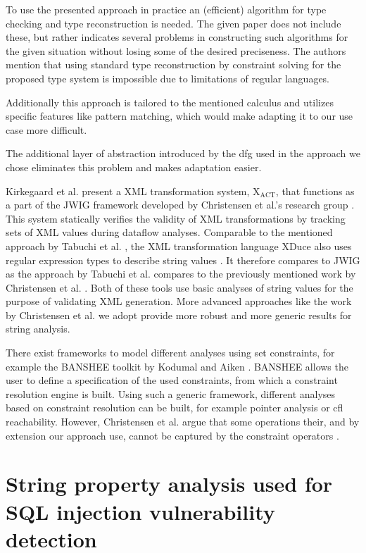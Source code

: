 To use the presented approach in practice an (efficient) algorithm for type checking and type reconstruction is needed. 
The given paper does not include these, but rather indicates several problems in constructing such algorithms for the given situation without losing some of the desired preciseness.
The authors mention that using standard type reconstruction by constraint solving for the proposed type system is impossible due to limitations of regular languages.

Additionally this approach is tailored to the mentioned calculus and utilizes specific features like pattern matching, which would make adapting it to our use case more difficult.

The additional layer of abstraction introduced by the \ac{dfg} used in the approach we chose eliminates this problem and makes adaptation easier.

Kirkegaard et al. present a XML transformation system, $\text{X}_{\text{ACT}}$, that functions as a part of the JWIG framework developed by Christensen et al.'s research group \cite{xact}. This system statically verifies the validity of XML transformations by tracking sets of XML values during dataflow analyses.
Comparable to the mentioned approach by Tabuchi et al. \cite{regex_types}, the XML transformation language XDuce also uses regular expression types to describe string values \cite{xduce}. It therefore compares to JWIG as the approach by Tabuchi et al. compares to the previously mentioned work by Christensen et al. \cite{brics}. 
Both of these tools use basic analyses of string values for the purpose of validating XML generation. More advanced approaches like the work by Christensen et al. we adopt provide more robust and more generic results for string analysis.

There exist frameworks to model different analyses using set constraints, for example the BANSHEE toolkit by Kodumal and Aiken \cite{banshee}. BANSHEE allows the user to define a specification of the used constraints, from which a constraint resolution engine is built. Using such a generic framework, different analyses based on constraint resolution can be built, for example pointer analysis or \ac{cfl} reachability. However, Christensen et al. argue that some operations their, and by extension our approach use, cannot be captured by the constraint operators \cite{brics}.

\section{String property analysis used for SQL injection vulnerability detection}

